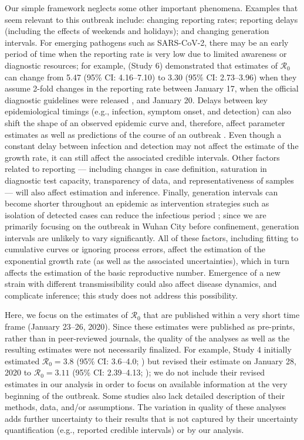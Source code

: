 \documentclass[12pt]{article}
\newcommand{\Ro}{\ensuremath{{\mathcal R}_{0}}\xspace}
\begin{document}
Our simple framework neglects some other important phenomena.
Examples that seem relevant to this outbreak include: changing reporting rates; reporting delays (including the effects of weekends and holidays); and changing generation intervals.
For emerging pathogens such as SARS-CoV-2, there may be an early period of time when the reporting rate is very low due to limited awareness or diagnostic resources;
for example, \cite{zhaoncov} (Study 6) demonstrated that estimates of \Ro can change from 5.47 (95\% CI: 4.16--7.10) to 3.30 (95\% CI: 2.73--3.96) when they assume 2-fold changes in the reporting rate between January 17, when the official diagnostic guidelines were released \citep{who17protocol}, and January 20.
Delays between key epidemiological timings (e.g., infection, symptom onset, and detection) can also shift the shape of an observed epidemic curve and, therefore, affect parameter estimates as well as predictions of the course of an outbreak \citep{tariq2019assessing}.
Even though a constant delay between infection and detection may not affect the estimate of the growth rate, it can still affect the associated credible intervals.
Other factors related to reporting --- including changes in case definition, saturation in diagnostic test capacity, transparency of data, and representativeness of samples --- will also affect estimation and inference.
Finally, generation intervals can become shorter throughout an epidemic as intervention strategies such as isolation of detected cases can reduce the infectious period \citep{hethcote2002effects};
since we are primarily focusing on the outbreak in Wuhan City before confinement, generation intervals are unlikely to vary significantly.
All of these factors, including fitting to cumulative curves or ignoring process errors, affect the estimation of the exponential growth rate (as well as the associated uncertainties), which in turn affects the estimation of the basic reproductive number.
Emergence of a new strain with different transmissibility could also affect disease dynamics, and complicate inference; this study does not address this possibility.

Here, we focus on the estimates of \Ro that are published within a very short time frame (January 23--26, 2020).
Since these estimates were published as pre-prints, rather than in peer-reviewed journals, the quality of the analyses as well as the resulting estimates were not necessarily finalized.
For example, Study 4 initially estimated $\Ro = 3.8$ (95\% CI: 3.6--4.0; \cite{readncov}) but revised their estimate on January 28, 2020 to $\Ro = 3.11$ (95\% CI: 2.39--4.13; \cite{readncov2});
we do not include their revised estimates in our analysis in order to focus on available information at the very beginning of the outbreak.
Some studies also lack detailed description of their methods, data, and/or assumptions.
The variation in quality of these analyses adds further uncertainty to their results that is not captured by their uncertainty quantification (e.g., reported credible intervals) or by our analysis.
\end{document}
